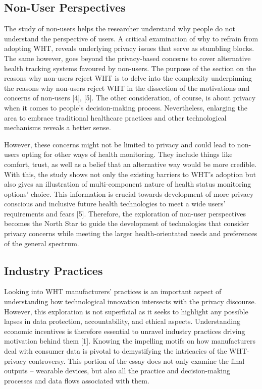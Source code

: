 \documentclass[11pt]{article}
\begin{document}
\subsection{Non-User Perspectives}

The study of non-users helps the researcher understand why people do not understand the perspective of users. A critical examination of why to refrain from adopting WHT, reveals underlying privacy issues that serve as stumbling blocks. The same however, goes beyond the privacy-based concerns to cover alternative health tracking systems favoured by non-users. The purpose of the section on the reasons why non-users reject WHT is to delve into the complexity underpinning the reasons why non-users reject WHT in the dissection of the motivations and concerns of non-users [4], [5]. The other consideration, of course, is about privacy when it comes to people’s decision-making process. Nevertheless, enlarging the area to embrace traditional healthcare practices and other technological mechanisms reveals a better sense.

However, these concerns might not be limited to privacy and could lead to non-users opting for other ways of health monitoring. They include things like comfort, trust, as well as a belief that an alternative way would be more credible. With this, the study shows not only the existing barriers to WHT’s adoption but also gives an illustration of multi-component nature of health status monitoring options’ choice. This information is crucial towards development of more privacy conscious and inclusive future health technologies to meet a wide users’ requirements and fears [5]. Therefore, the exploration of non-user perspectives becomes the North Star to guide the development of technologies that consider privacy concerns while meeting the larger health-orientated needs and preferences of the general spectrum.

\subsection{Industry Practices}

Looking into WHT manufacturers’ practices is an important aspect of understanding how technological innovation intersects with the privacy discourse. However, this exploration is not superficial as it seeks to highlight any possible lapses in data protection, accountability, and ethical aspects. Understanding economic incentives is therefore essential to unravel industry practices driving motivation behind them [1]. Knowing the impelling motifs on how manufacturers deal with consumer data is pivotal to demystifying the intricacies of the WHT-privacy controversy. This portion of the essay does not only examine the final outputs -- wearable devices, but also all the practice and decision-making processes and data flows associated with them.
\end{document}
